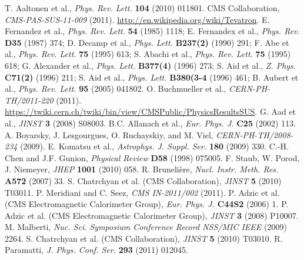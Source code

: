\documentclass[12pt, letterpaper]{report}
\begin{document}
\begin{thebibliography}{99}
 T. Aaltonen et al., \textit{Phys. Rev. Lett.} \textbf{104} (2010) 011801.
 CMS Collaboration, \textit{CMS-PAS-SUS-11-009} (2011).
 \url{http://en.wikipedia.org/wiki/Tevatron}.
 E. Fernandez et al., \textit{Phys. Rev. Lett.} \textbf{54} (1985) 1118; E. Fernandex et al., \textit{Phys. Rev.} \textbf{D35} (1987) 374; D. Decamp et al., \textit{Phys. Lett.} \textbf{B237(2)} (1990) 291; F. Abe et al., \textit{Phys. Rev. Lett.} \textbf{75} (1995) 613; S. Abachi et al., \textit{Phys. Rev. Lett.} \textbf{75} (1995) 618; G. Alexander et al., \textit{Phys. Lett.} \textbf{B377(4)} (1996) 273; S. Aid et al., \textit{Z. Phys.} \textbf{C71(2)} (1996) 211; S. Aid et al., \textit{Phys. Lett.} \textbf{B380(3-4} (1996) 461; B. Aubert et al., \textit{Phys. Rev. Lett.} \textbf{95} (2005) 041802.
 O. Buchmueller et al., \textit{CERN-PH-TH/2011-220} (2011).
 \url{https://twiki.cern.ch/twiki/bin/view/CMSPublic/PhysicsResultsSUS}.
 G. Aad et al., \textit{JINST} \textbf{3} (2008) S08003.
 B.C. Allanach et al., \textit{Eur. Phys. J.} \textbf{C25} (2002) 113.
 A. Boyarsky, J. Lesgourgues, O. Ruchayskiy, and M. Viel, \textit{CERN-PH-TH/2008-234} (2009).
 E. Komatsu et al., \textit{Astrophys. J. Suppl. Ser.} \textbf{180} (2009) 330.
 C.-H. Chen and J.F. Gunion, \textit{Physical Review} \textbf{D58} (1998) 075005.
 F. Staub, W. Porod, J. Niemeyer, \textit{JHEP} \textbf{1001} (2010) 058.
 R. Bruneli\`ere, \textit{Nucl. Instr. Meth. Res.} \textbf{A572} (2007) 33.
 S. Chatrchyan et al. (CMS Collaboration), \textit{JINST} \textbf{5} (2010) T03011.
 P. Meridiani and C. Seez, \textit{CMS IN-2011/002} (2011).
 P. Adzic et al. (CMS Electromagnetic Calorimeter Group), \textit{Eur. Phys. J.} \textbf{C44S2} (2006) 1.
 P. Adzic et al. (CMS Electromagnetic Calorimeter Group), \textit{JINST} \textbf{3} (2008) P10007.
 M. Malberti, \textit{Nuc. Sci. Symposium Conference Record NSS/MIC IEEE} (2009) 2264.
 S. Chatrchyan et al. (CMS Collaboration), \textit{JINST} \textbf{5} (2010) T03010.
 R. Paramatti, \textit{J. Phys. Conf. Ser.} \textbf{293} (2011) 012045.

\end{thebibliography}
\end{document}

